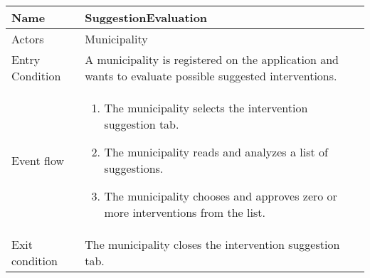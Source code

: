 \vskip 0.2in
\begin{tabular}{|p{3.7cm}|p{11cm}|}
\hline
Name & SuggestionEvaluation\\
\hline
Actors & Municipality\\
\hline
Entry Condition & A municipality is registered on the application and wants to evaluate possible suggested interventions.\\
\hline
Event flow & \begin{enumerate}
			\item The municipality selects the intervention suggestion tab.
			\item The municipality reads and analyzes a list of suggestions.
			\item The municipality chooses and approves zero or more interventions from the list.
            \end{enumerate}\\
\hline
Exit condition & The municipality closes the intervention suggestion tab.\\
\hline
\end{tabular}